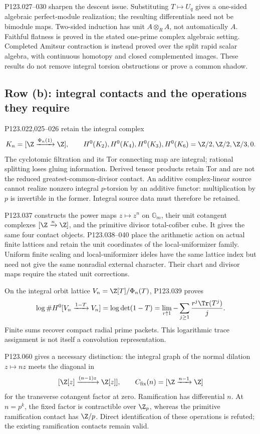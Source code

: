P123.027--030 sharpen the descent issue. Substituting $T\mapsto U_q$
gives a one-sided algebraic perfect-module realization; the resulting
differentials need not be bimodule maps. Two-sided induction has unit
$A\otimes_R A$, not automatically $A$. Faithful flatness is proved in
the stated one-prime complex algebraic setting. Completed Amitsur
contraction is instead proved over the split rapid scalar algebra, with
continuous homotopy and closed complemented images. These results do
not remove integral torsion obstructions or prove a common shadow.

\subsection{Row (b): integral contacts and the operations they require}
P123.022,025--026 retain the integral complex
\[
 K_n=[\Z\xrightarrow{\Phi_n(1)}\Z],\qquad
 H^0(K_2),H^0(K_4),H^0(K_3),H^0(K_6)
 =\Z/2,\Z/2,\Z/3,0.
\]
The cyclotomic filtration and its Tor connecting map are integral;
rational splitting loses gluing information. Derived tensor products
retain Tor and are not the reduced greatest-common-divisor contact.
An additive complex-linear source cannot realize nonzero integral
$p$-torsion by an additive functor: multiplication by $p$ is invertible
in the former. Integral source data must therefore be retained.

P123.037 constructs the power maps $z\mapsto z^n$ on $\mathbb G_m$,
their unit cotangent complexes $[\Z\xrightarrow n\Z]$, and the primitive
divisor total-cofiber cube. It gives the same four contact objects.
P123.038--040 place the arithmetic action on actual finite lattices and
retain the unit coordinates of the local-uniformizer family. Uniform
finite scaling and local-uniformizer ideles have the same lattice index
but need not give the same nonradial external character. Their chart and
divisor maps require the stated unit corrections.

On the integral orbit lattice $V_n=\Z[T]/\Phi_n(T)$, P123.039 proves
\[
 \log\#H^0[V_n\xrightarrow{1-T}V_n]
 =\log\det(1-T)
 =\lim_{r\uparrow1}-\sum_{j\ge1}\frac{r^j\Tr(T^j)}j.
\]
Finite sums recover compact radial prime packets. This logarithmic
trace assignment is not itself a convolution representation.

P123.060 gives a necessary distinction: the integral graph of the normal
dilation $z\mapsto nz$ meets the diagonal in
\[
 [\Z[z]\xrightarrow{(n-1)z}\Z[z]],
 \qquad C_{\rm fix}(n)=[\Z\xrightarrow{n-1}\Z]
\]
for the transverse cotangent factor at zero. Ramification has differential
$n$. At $n=p^k$, the fixed factor is contractible over $\Z_p$, whereas
the primitive ramification contact has $\Z/p$. Direct identification of
these operations is refuted; the existing ramification contacts remain valid.

